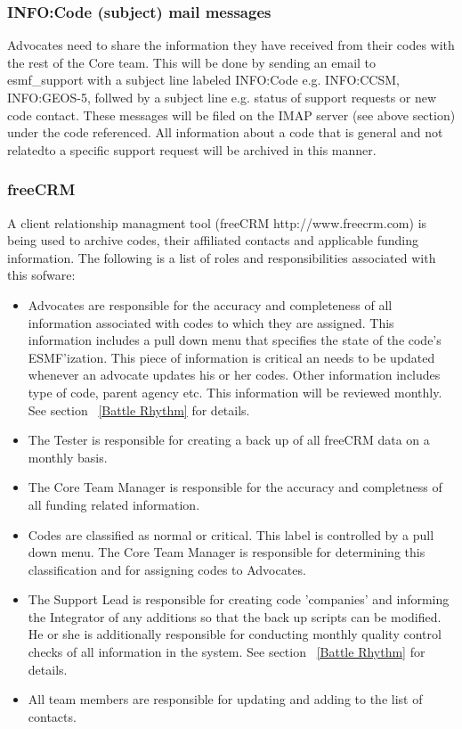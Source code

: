 \subsubsection{INFO:Code (subject) mail messages}
Advocates need to share the information they have received from their codes with the rest of the Core team. This will be done by sending an email to esmf\_support with a subject line labeled INFO:Code e.g. INFO:CCSM, INFO:GEOS-5, follwed by a subject line e.g. status of support requests or new code contact.  These messages will be filed on the IMAP server (see above section) under the code referenced. All information about a code that is general and not relatedto a specific support request will be archived in this manner. 

\subsubsection{freeCRM}
A client relationship managment tool (freeCRM http://www.freecrm.com) is being used to archive codes, their affiliated contacts and applicable funding information. The following is a list of roles and responsibilities associated with this sofware:
\begin{itemize}
\item Advocates are responsible for the accuracy and completeness of all information associated with codes to which they are assigned.  This information includes a pull down menu that specifies the state of the code's ESMF'ization. This piece of information is critical an needs to be updated whenever an advocate updates his or her codes. Other information includes type of code, parent agency etc. This information will be reviewed monthly. See section ~\ref{Battle Rhythm} for details.
\item The Tester is responsible for creating a back up of all freeCRM data on a monthly basis.
\item The Core Team Manager is responsible for the accuracy and completness of all funding related information.
\item Codes are classified as normal or critical. This label is controlled by a pull down menu. The Core Team Manager is responsible for determining this classification and for assigning codes to Advocates.
\item The Support Lead is responsible for creating code 'companies' and informing the Integrator of any additions so that the back up scripts can be modified. He or she is additionally responsible for conducting monthly quality control checks of all information in the system. See section ~\ref{Battle Rhythm} for details.
\item All team members are responsible for updating and adding to the list of contacts. 
\end{itemize} 

